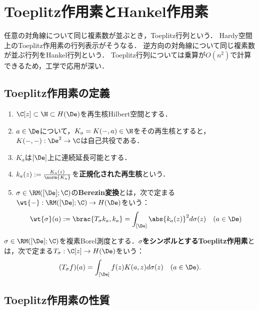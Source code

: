 \documentclass[uplatex,dvipdfmx]{jsreport}
\begin{document}
\section{Toeplitz作用素とHankel作用素}

\begin{tcolorbox}[colframe=ForestGreen, colback=ForestGreen!10!white,breakable,colbacktitle=ForestGreen!40!white,coltitle=black,fonttitle=\bfseries\sffamily,
title=]
    任意の対角線について同じ複素数が並ぶとき，Toeplitz行列という．
    Hardy空間上のToeplitz作用素の行列表示がそうなる．
    逆方向の対角線について同じ複素数が並ぶ行列をHankel行列という．
    Toeplitz行列については乗算が$O(n^2)$で計算できるため，工学で応用が深い．
\end{tcolorbox}

\subsection{Toeplitz作用素の定義}

\begin{assumption}\mbox{}
    \begin{enumerate}
        \item $\C[z]\subset\H\subset H(\De)$を再生核Hilbert空間とする．
        \item $a\in\De$について，$K_a=K(-,a)\in\H$をその再生核とすると，$K(-,-):\De^2\to\C$は自己共役である．
        \item $K_a$は$[\De]$上に連続延長可能とする．
        \item $k_a(z):=\frac{K_a(z)}{\norm{K_a}}$を\textbf{正規化された再生核}という．
        \item $\sigma\in\RM([\De];\C)$の\textbf{Berezin変換}とは，次で定まる$\wt{-}:\RM([\De];\C)\to H(\De)$をいう：
        \[\wt{\sigma}(a):=\brac{T_\sigma k_a,k_a}=\int_{[\De]}\abs{k_a(z)}^2d\sigma(z)\quad(a\in\De)\]
    \end{enumerate}
\end{assumption}

\begin{definition}
    $\sigma\in\RM([\De];\C)$を複素Borel測度とする．\textbf{$\sigma$をシンボルとするToeplitz作用素}とは，次で定まる$T_\sigma:\C[z]\to H(\De)$をいう：
    \[(T_\sigma f)(a)=\int_{[\De]}f(z)K(a,z)d\sigma(z)\quad(a\in\De).\]
\end{definition}

\subsection{Toeplitz作用素の性質}
\end{document}

